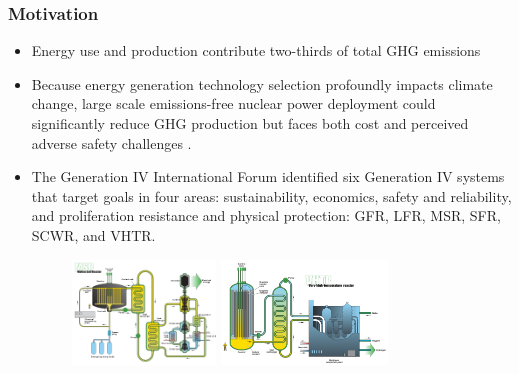 \begin{frame}
    \frametitle{Motivation}
    \begin{itemize}
      \item Energy use and production contribute two-thirds of total \gls{GHG} emissions \cite{noauthor_climate_2018}
      \item Because energy generation technology selection profoundly impacts climate change, 
      large scale emissions-free nuclear power deployment could 
      significantly reduce GHG production but faces both cost and perceived adverse 
      safety challenges \cite{noauthor_climate_2018, petti_future_2018}.
      \item The Generation IV International Forum identified six Generation IV systems 
      that target goals in four areas: sustainability, 
      economics, safety and reliability, and proliferation resistance and physical 
      protection: GFR, LFR, MSR, SFR, SCWR, and VHTR. 
      \begin{figure}[htbp!]
          \includegraphics[height=2.8cm]{figures/msr}
          \hspace{1cm}
          \includegraphics[height=2.8cm]{figures/vhtr}
      \end{figure}
    \end{itemize}
  \end{frame}
